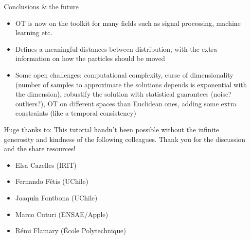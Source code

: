 \documentclass[pdf,aspectratio=169,10pt]{beamer}
\begin{document}
\begin{frame}{Conclusions \& the future}
    \begin{itemize}
        \item OT is now on the toolkit for many fields such as signal processing, machine learning etc.
        \item Defines a meaningful distances between distribution, with the extra information on how the particles should be moved
        \item Some open challenges: computational complexity, curse of dimensionality (number of samples to approximate the solutions depends is exponential with the dimension), robustify the solution with statistical guarantees (noise? outliers?), OT on different spaces than Euclidean ones, adding some extra constraints (like a temporal consistency)
    \end{itemize}
\end{frame}

\begin{frame}{Huge thanks to:}
This tutorial handn't been possible without the infinite generosity and kindness of the following colleagues. Thank you for the discussion and the share resources! 
    \begin{itemize}
        \item Elsa Cazelles (IRIT)
        \item Fernando Fêtis (UChile)
        \item Joaquín Fontbona (UChile)
        \item Marco Cuturi (ENSAE/Apple)
        \item Rémi Flamary (École Polytechnique)
    \end{itemize}
\end{frame}








\begin{frame}[plain]
    \titlepage
\end{frame}
\end{document}
